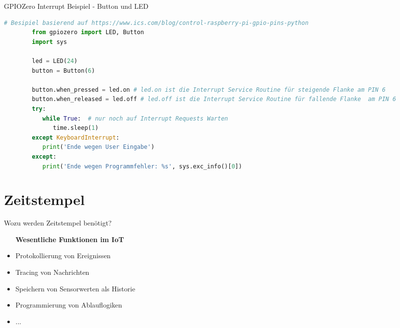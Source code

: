 \begin{frame}[fragile]{GPIOZero Interrupt Beispiel - Button und LED}
  \begin{lstlisting}[language=Python, gobble=8]
        # Besipiel basierend auf https://www.ics.com/blog/control-raspberry-pi-gpio-pins-python
        from gpiozero import LED, Button
        import sys

        led = LED(24)
        button = Button(6)

        button.when_pressed = led.on # led.on ist die Interrupt Service Routine für steigende Flanke am PIN 6
        button.when_released = led.off # led.off ist die Interrupt Service Routine für fallende Flanke  am PIN 6
        try:
           while True:  # nur noch auf Interrupt Requests Warten
              time.sleep(1)
        except KeyboardInterrupt:
           print('Ende wegen User Eingabe')
        except:
           print('Ende wegen Programmfehler: %s', sys.exc_info()[0])

        \end{lstlisting}

\end{frame}


\section{Zeitstempel}

\begin{frame}{Wozu werden Zeitstempel benötigt?}
    \begin{itemize}
        \setlength{\itemindent}{1.9in}
        \item [\textbf{Wesentliche Funktionen im IoT}]
    \end{itemize}

    \begin{itemize}
        \item Protokollierung von Ereignissen
        \item Tracing von Nachrichten
        \item Speichern von Sensorwerten als Historie
        \item Programmierung von Ablauflogiken
        \item ...
     \end{itemize}
\end{frame}


